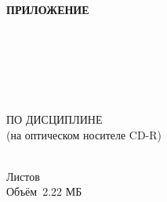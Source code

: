 \begin{ESKDtitlePage}
    \begin{flushright}
        \textbf{ПРИЛОЖЕНИЕ~\gpiPrilLetter} \enspace\enspace
    \end{flushright}
    \begin{center}
        \gpiEdu \\
        \gpiKaf \\
    \end{center}

    \vfill

    \begin{center}
        \gpiTopic \\
    \end{center}

    \vfill

    \begin{center}
        \textbf{\gpiDocTopic} \\
        ПО ДИСЦИПЛИНЕ \gpiDiscipline \\
        (на оптическом носителе CD-R) \\
    \end{center}

    \vfill

    \begin{center}
        \gpiCode \\
        Листов \pageref{LastPage} \\
        Объём~2.22 МБ \\
    \end{center}

    \vfill

    

    \vfill

    \begin{center}
        \ESKDtheYear
    \end{center}
\end{ESKDtitlePage}
